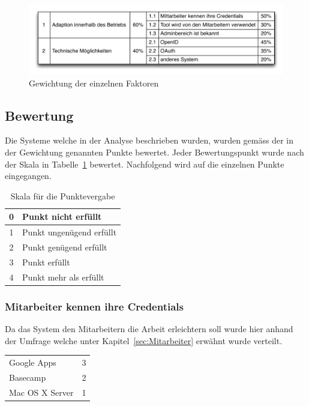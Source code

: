 \begin{figure}[H]
    \centering 
		\includegraphics[width=1\textwidth]{include/nutzwertanalyse1.pdf}
		\caption{Gewichtung der einzelnen Faktoren}
		\label{fig:nutzwertanalyse gewichtung}
\end{figure}

\subsection{Bewertung}
\label{sub:Bewertung}
Die Systeme welche in der Analyse beschrieben wurden, wurden gemäss der in der Gewichtung genannten Punkte bewertet. Jeder Bewertungspunkt wurde nach der Skala in Tabelle~\ref{tab:nutzwertanalyse skala} bewertet. Nachfolgend wird auf die einzelnen Punkte eingegangen.

\begin{table}[h]
    \centering
        \begin{tabular}{|c|l|}
        \hline
        0 & Punkt nicht erfüllt\\
        \hline
        1 & Punkt ungenügend erfüllt\\
        \hline
        2 & Punkt genügend erfüllt\\
        \hline
        3 & Punkt erfüllt\\
        \hline
        4 & Punkt mehr als erfüllt\\
        \hline
        \end{tabular}
		\caption{Skala für die Punktevergabe}
		\label{tab:nutzwertanalyse skala}
\end{table}


\subsubsection{Mitarbeiter kennen ihre Credentials}
\label{ssub:Mitarbeiter kennen ihre Credentials}
Da das System den Mitarbeitern die Arbeit erleichtern soll wurde hier anhand der Umfrage welche unter Kapitel~\ref{sec:Mitarbeiter} erwähnt wurde verteilt.

\begin{tabular}{lc}
Google Apps & 3\\
Basecamp & 2\\
Mac OS X Server & 1\\
\end{tabular}

